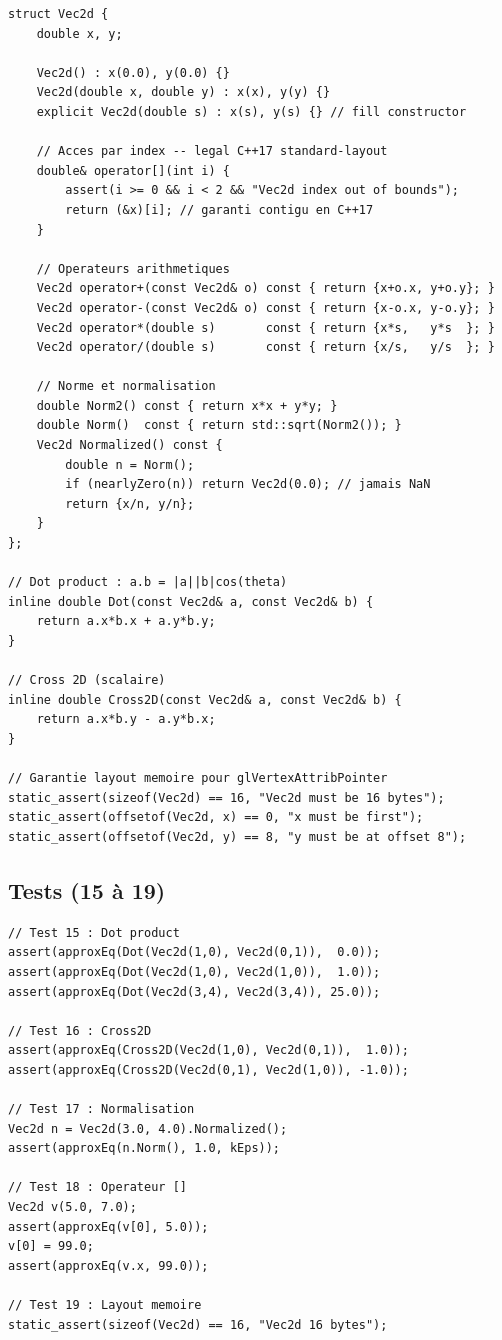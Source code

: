 \documentclass[12pt,a4paper]{report}
\begin{document}
\begin{lstlisting}[caption={Vec2d.h --- structure complete}]
struct Vec2d {
    double x, y;

    Vec2d() : x(0.0), y(0.0) {}
    Vec2d(double x, double y) : x(x), y(y) {}
    explicit Vec2d(double s) : x(s), y(s) {} // fill constructor

    // Acces par index -- legal C++17 standard-layout
    double& operator[](int i) {
        assert(i >= 0 && i < 2 && "Vec2d index out of bounds");
        return (&x)[i]; // garanti contigu en C++17
    }

    // Operateurs arithmetiques
    Vec2d operator+(const Vec2d& o) const { return {x+o.x, y+o.y}; }
    Vec2d operator-(const Vec2d& o) const { return {x-o.x, y-o.y}; }
    Vec2d operator*(double s)       const { return {x*s,   y*s  }; }
    Vec2d operator/(double s)       const { return {x/s,   y/s  }; }

    // Norme et normalisation
    double Norm2() const { return x*x + y*y; }
    double Norm()  const { return std::sqrt(Norm2()); }
    Vec2d Normalized() const {
        double n = Norm();
        if (nearlyZero(n)) return Vec2d(0.0); // jamais NaN
        return {x/n, y/n};
    }
};

// Dot product : a.b = |a||b|cos(theta)
inline double Dot(const Vec2d& a, const Vec2d& b) {
    return a.x*b.x + a.y*b.y;
}

// Cross 2D (scalaire)
inline double Cross2D(const Vec2d& a, const Vec2d& b) {
    return a.x*b.y - a.y*b.x;
}

// Garantie layout memoire pour glVertexAttribPointer
static_assert(sizeof(Vec2d) == 16, "Vec2d must be 16 bytes");
static_assert(offsetof(Vec2d, x) == 0, "x must be first");
static_assert(offsetof(Vec2d, y) == 8, "y must be at offset 8");
\end{lstlisting}

\subsection{Tests (15 à 19)}

\begin{lstlisting}[caption={Tests Vec2d}]
// Test 15 : Dot product
assert(approxEq(Dot(Vec2d(1,0), Vec2d(0,1)),  0.0));
assert(approxEq(Dot(Vec2d(1,0), Vec2d(1,0)),  1.0));
assert(approxEq(Dot(Vec2d(3,4), Vec2d(3,4)), 25.0));

// Test 16 : Cross2D
assert(approxEq(Cross2D(Vec2d(1,0), Vec2d(0,1)),  1.0));
assert(approxEq(Cross2D(Vec2d(0,1), Vec2d(1,0)), -1.0));

// Test 17 : Normalisation
Vec2d n = Vec2d(3.0, 4.0).Normalized();
assert(approxEq(n.Norm(), 1.0, kEps));

// Test 18 : Operateur []
Vec2d v(5.0, 7.0);
assert(approxEq(v[0], 5.0));
v[0] = 99.0;
assert(approxEq(v.x, 99.0));

// Test 19 : Layout memoire
static_assert(sizeof(Vec2d) == 16, "Vec2d 16 bytes");
\end{lstlisting}
\end{document}
